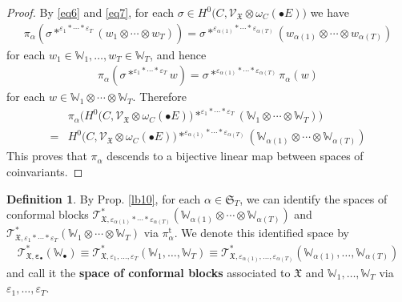 \documentclass[11pt,b5paper,notitlepage]{article}
\theoremstyle{definition}
\newtheorem{df}{Definition}[section]
\theoremstyle{plain}
\newcommand{\fk}{\mathfrak}
\newcommand{\tr}{\mathrm{t}} %
\newcommand{\SV}{\mathscr{V}}
\newcommand{\blt}{\bullet}
\newcommand{\Wbb}{\mathbb W}
\newcommand{\<}{\left\langle}
\renewcommand{\>}{\right\rangle}
\newcommand{\fx}{\mathfrak{X}}
\newcommand{\ST}{\mathscr{T}}
\newcommand{\eps}{\varepsilon}
\numberwithin{equation}{section}
\begin{document}
\begin{proof}
By \eqref{eq6} and \eqref{eq7}, for each $\sigma\in H^0\big(C,\SV_\fx\otimes \omega_C(\blt E)\big)$ we have
\begin{align*}
\pi_\alpha(\sigma *^{\eps_1*\cdots*\eps_T}(w_1\otimes\cdots\otimes w_T))=\sigma *^{\eps_{\alpha(1)}*\cdots*\eps_{\alpha(T)}}(w_{\alpha(1)}\otimes\cdots\otimes w_{\alpha(T)})
\end{align*}
for each $w_1\in\Wbb_1,\dots,w_T\in\Wbb_T$, and hence 
\begin{align}
\pi_\alpha(\sigma *^{\eps_1*\cdots*\eps_T}w)=\sigma *^{\eps_{\alpha(1)}*\cdots*\eps_{\alpha(T)}}\pi_\alpha(w)
\end{align}
for each $w\in\Wbb_1\otimes\cdots\otimes\Wbb_T$. Therefore
\begin{align*}
&\pi_\alpha\Big(H^0\big(C,\SV_\fx\otimes \omega_C(\blt E)\big)*^{\eps_1*\cdots*\eps_T} (\Wbb_1\otimes\cdots\otimes\Wbb_T)\Big)\\
=&H^0\big(C,\SV_\fx\otimes \omega_C(\blt E)\big)*^{\eps_{\alpha(1)}*\cdots*\eps_{\alpha(T)}} (\Wbb_{\alpha(1)}\otimes \cdots \otimes \Wbb_{\alpha(T)})
\end{align*}
This proves that $\pi_\alpha$ descends to a bijective linear map between spaces of coinvariants.
\end{proof}


\begin{df}\label{lb35}
By Prop. \ref{lb10}, for each $\alpha\in\fk S_T$, we can identify the spaces of conformal blocks $\ST_{\fx,\eps_{\alpha(1)}*\cdots*\eps_{\alpha(T)}}^*(\Wbb_{\alpha(1)}\otimes \cdots \otimes \Wbb_{\alpha(T)})$ and $\ST_{\fx,\eps_{1}*\cdots*\eps_{T}}^*(\Wbb_{1}\otimes \cdots \otimes \Wbb_{T})$ via $\pi_\alpha^\tr$. We denote this identified space by
\begin{align*}
\pmb{\ST_{\fx,\eps_\blt}^*(\Wbb_\blt)}\equiv\ST^*_{\fx,\eps_1,\dots,\eps_T}(\Wbb_1,\dots,\Wbb_T)\equiv\ST^*_{\fx,\eps_{\alpha(1)},\dots,\eps_{\alpha(T)}}(\Wbb_{\alpha(1)},\dots,\Wbb_{\alpha(T)})
\end{align*}
and call it the \textbf{space of conformal blocks} associated to $\fx$ and $\Wbb_1,\dots,\Wbb_T$ via $\eps_1,\dots,\eps_T$.
\end{df}
\end{document}
